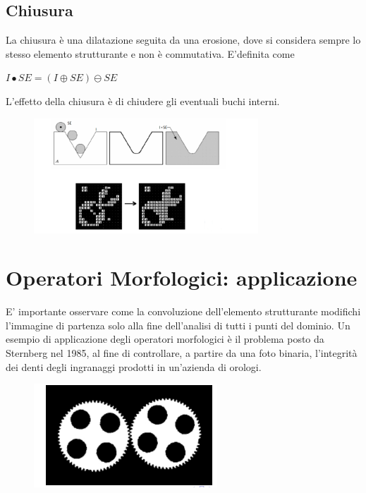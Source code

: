 \subsection{Chiusura}
La chiusura è una dilatazione seguita da una erosione, dove si considera sempre lo stesso elemento strutturante e non è
commutativa.
E'definita come

\begin{center}
    $I \bullet SE = (I \oplus SE) \ominus SE$
\end{center}

L'effetto della chiusura è di chiudere gli eventuali buchi interni.

\begin{figure}[H]
    \centering
    \includegraphics[width=\linewidth, keepaspectratio]{capitoli/immagini/imgs/chiusura.png}
\end{figure}

\section{Operatori Morfologici: applicazione}
E' importante osservare come la convoluzione dell'elemento strutturante modifichi l'immagine di partenza solo alla fine
dell'analisi di tutti i punti del dominio. Un esempio di applicazione degli operatori morfologici è il problema posto da Sternberg nel 1985, al fine di controllare, a
partire da una foto binaria, l'integrità dei denti degli ingranaggi prodotti in un'azienda di orologi.

\begin{figure}[H]
    \centering
    \includegraphics[width=\linewidth, keepaspectratio]{capitoli/immagini/imgs/orologi-esempio.png}
\end{figure}


